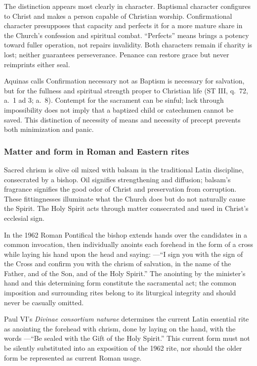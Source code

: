 The distinction appears most clearly in character. Baptismal character configures to Christ and makes a person capable of Christian worship. Confirmational character presupposes that capacity and perfects it for a more mature share in the Church's confession and spiritual combat. ``Perfects'' means brings a potency toward fuller operation, not repairs invalidity. Both characters remain if charity is lost; neither guarantees perseverance. Penance can restore grace but never reimprints either seal.

Aquinas calls Confirmation necessary not as Baptism is necessary for salvation, but for the fullness and spiritual strength proper to Christian life (ST III, q.~72, a.~1 ad 3; a.~8). Contempt for the sacrament can be sinful; lack through impossibility does not imply that a baptized child or catechumen cannot be saved. This distinction of necessity of means and necessity of precept prevents both minimization and panic.

\subsubsection{Matter and form in Roman and Eastern rites}

Sacred chrism is olive oil mixed with balsam in the traditional Latin discipline, consecrated by a bishop. Oil signifies strengthening and diffusion; balsam's fragrance signifies the good odor of Christ and preservation from corruption. These fittingnesses illuminate what the Church does but do not naturally cause the Spirit. The Holy Spirit acts through matter consecrated and used in Christ's ecclesial sign.

In the 1962 Roman Pontifical the bishop extends hands over the candidates in a common invocation, then individually anoints each forehead in the form of a cross while laying his hand upon the head and saying: ---``I sign you with the sign of the Cross and confirm you with the chrism of salvation, in the name of the Father, and of the Son, and of the Holy Spirit.'' The anointing by the minister's hand and this determining form constitute the sacramental act; the common imposition and surrounding rites belong to its liturgical integrity and should never be casually omitted.

Paul VI's \emph{Divinae consortium naturae} determines the current Latin essential rite as anointing the forehead with chrism, done by laying on the hand, with the words ---``Be sealed with the Gift of the Holy Spirit.'' This current form must not be silently substituted into an exposition of the 1962 rite, nor should the older form be represented as current Roman usage.

